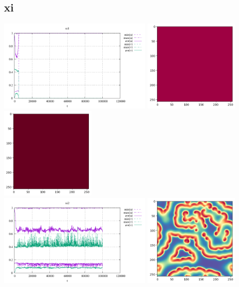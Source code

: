\subsection*{xi}
\begin{center}
\includegraphics[height=4.5cm]{python_codes/fieldstone_171/results/xi1_stats}
\includegraphics[height=4.5cm]{python_codes/fieldstone_171/results/xi1_solution_final_u.png}
\includegraphics[height=4.5cm]{python_codes/fieldstone_171/results/xi1_solution_final_v.png}\\
\includegraphics[height=4.5cm]{python_codes/fieldstone_171/results/xi2_stats}
\includegraphics[height=4.5cm]{python_codes/fieldstone_171/results/xi2_solution_final_u.png}

\end{center}
